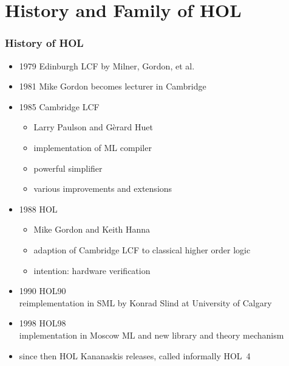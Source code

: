 \section{History and Family of HOL}

\begin{frame}
\frametitle{History of HOL}

\begin{itemize}
\item 1979 Edinburgh LCF by Milner, Gordon, et al.
\item 1981 Mike Gordon becomes lecturer in Cambridge
\item 1985 Cambridge LCF
\begin{itemize}
\item Larry Paulson and G\`{e}rard Huet
\item implementation of ML compiler
\item powerful simplifier
\item various improvements and extensions
\end{itemize}
\item 1988 HOL
\begin{itemize}
\item Mike Gordon and Keith Hanna
\item adaption of Cambridge LCF to classical higher order logic
\item intention: hardware verification
\end{itemize}
\item 1990 HOL90\\ reimplementation in SML by Konrad Slind at University of Calgary
\item 1998 HOL98\\ implementation in Moscow ML and new library and theory mechanism
\item since then HOL Kananaskis releases, called informally \alert{HOL~4}
\end{itemize}
\end{frame}

